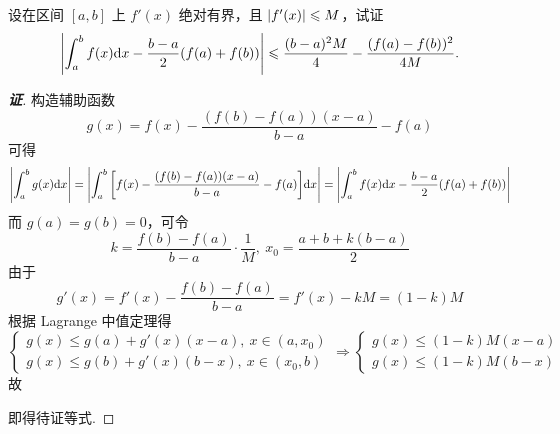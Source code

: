 \begin{example}
    设在区间 $[a,b]$ 上 $f'(x)$ 绝对有界，且 $\qty|f'(x)|\leqslant M$，试证
    $$\qty|\int_{a}^{b}f(x)\dd x-\dfrac{b-a}{2}(f(a)+f(b))|\leqslant \dfrac{(b-a)^2M}{4}-\dfrac{(f(a)-f(b))^2}{4M}.$$
\end{example}
\begin{proof}[{\songti \textbf{证}}]
    构造辅助函数 $$g(x)=f(x)-\dfrac{(f(b)-f(a))(x-a)}{b-a}-f(a)$$
    可得 $$\qty|\int_{a}^{b}g(x)\dd x|=\qty|\int_{a}^{b}\qty[f(x)-\dfrac{(f(b)-f(a))(x-a)}{b-a}-f(a)]\dd x|=\qty|\int_{a}^{b}f(x)\dd x-\dfrac{b-a}{2}(f(a)+f(b))|$$
    而 $g(a)=g(b)=0$，可令 $$k=\dfrac{f(b)-f(a)}{b-a}\cdot\dfrac{1}{M},~x_0=\dfrac{a+b+k(b-a)}{2}$$
    由于 $$g'(x)=f'(x)-\dfrac{f(b)-f(a)}{b-a}=f'(x)-kM=(1-k)M$$
    根据 Lagrange 中值定理得
    $$\begin{cases}
            g(x)\leqslant g(a)+g'(x)(x-a),~x\in(a,x_0) \\
            g(x)\leqslant g(b)+g'(x)(b-x),~x\in(x_0,b)
        \end{cases}\Rightarrow \begin{cases}
            g(x)\leqslant (1-k)M(x-a) \\
            g(x)\leqslant (1-k)M(b-x)
        \end{cases}$$
    故
    即得待证等式.
\end{proof}

